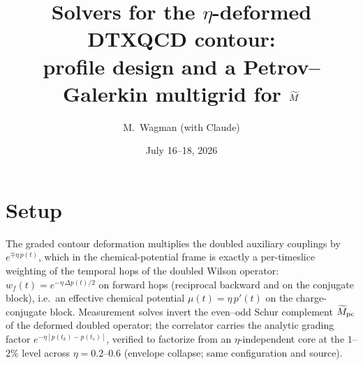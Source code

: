 \documentclass[11pt]{article}
\title{Solvers for the $\eta$-deformed DTXQCD contour:\\
profile design and a Petrov--Galerkin multigrid for $\Mt$}
\author{M.~Wagman (with Claude)}
\date{July 16--18, 2026}
\newcommand{\Mt}{\widetilde{M}}
\begin{document}
\maketitle

\section{Setup}
The graded contour deformation multiplies the doubled auxiliary couplings by
$e^{\mp\eta\,p(t)}$, which in the chemical-potential frame is exactly a
per-timeslice weighting of the temporal hops of the doubled Wilson operator:
$w_f(t)=e^{-\eta\,\Delta p(t)/2}$ on forward hops (reciprocal backward and on
the conjugate block), i.e.\ an effective chemical potential
$\mu(t)=\eta\,p'(t)$ on the charge-conjugate block.  Measurement solves
invert the even--odd Schur complement $\Mt_{\rm pc}$ of the deformed doubled
operator; the correlator carries the analytic grading factor
$e^{-\eta[p(t_k)-p(t_s)]}$, verified to factorize from an
$\eta$-independent core at the $1$--$2\%$ level across
$\eta=0.2$--$0.6$ (envelope collapse; same configuration and source).
\end{document}
